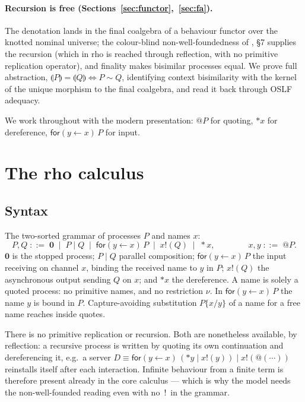 \documentclass[11pt]{article}
\makeatletter
\newcommand{\Zero}{\mathbf{0}}
\newcommand{\Par}{\mathbin{\mid}}
\newcommand{\inp}[3]{\mathsf{for}(#1 \leftarrow #2)\,#3}
\newcommand{\out}[2]{#1\mathbin{!}(#2)}
\newcommand{\drp}[1]{{\ast}#1}
\newcommand{\quo}[1]{@#1}
\newcommand{\sem}[1]{\llparenthesis #1\rrparenthesis}   %
\newcommand{\bis}{\sim}
\newcommand{\scong}{\equiv}
\theoremstyle{plain}
\theoremstyle{definition}
\makeatother
\begin{document}
\paragraph{Recursion is free (Sections~\ref{sec:functor},~\ref{sec:fa}).}
The denotation lands in the final coalgebra of a behaviour functor over the knotted
nominal universe; the colour-blind non-well-foundedness of \cite{knot}, \S7
supplies the recursion (which in rho is reached through reflection, with no
primitive replication operator), and finality makes bisimilar processes equal. We
prove full abstraction, $\sem P=\sem Q\iff P\bis Q$, identifying context
bisimilarity with the kernel of the unique morphism to the final coalgebra, and
read it back through OSLF adequacy.

We work throughout with the modern presentation: $\quo P$ for quoting, $\drp x$
for dereference, $\inp y x P$ for input.

\section{The rho calculus}\label{sec:rho}

\subsection{Syntax}
The two-sorted grammar of processes $P$ and names $x$:
\[
  P,Q \;::=\; \Zero \;\mid\; P \Par Q \;\mid\; \inp y x P \;\mid\; \out x Q
            \;\mid\; \drp x,
  \qquad\qquad
  x,y \;::=\; \quo P .
\]
$\Zero$ is the stopped process; $P\Par Q$ parallel composition; $\inp y x P$ the
input receiving on channel $x$, binding the received name to $y$ in $P$;
$\out x Q$ the asynchronous output sending $Q$ on $x$; and $\drp x$ the
dereference. A name is solely a quoted process: no primitive names, and no
restriction $\nu$. In $\inp y x P$ the name $y$ is bound in $P$. Capture-avoiding
substitution $P\{x/y\}$ of a name for a free name reaches inside quotes.

There is no primitive replication or recursion. Both are nonetheless available, by
reflection: a recursive process is written by quoting its own continuation and
dereferencing it, e.g.\ a server
$D \scong \inp y x (\drp y \Par \out x y)\Par\out x{\quo{(\cdots)}}$ reinstalls
itself after each interaction. Infinite behaviour from a finite term is therefore
present already in the core calculus --- which is why the model needs the
non-well-founded reading even with no $\,!\,$ in the grammar.
\end{document}
